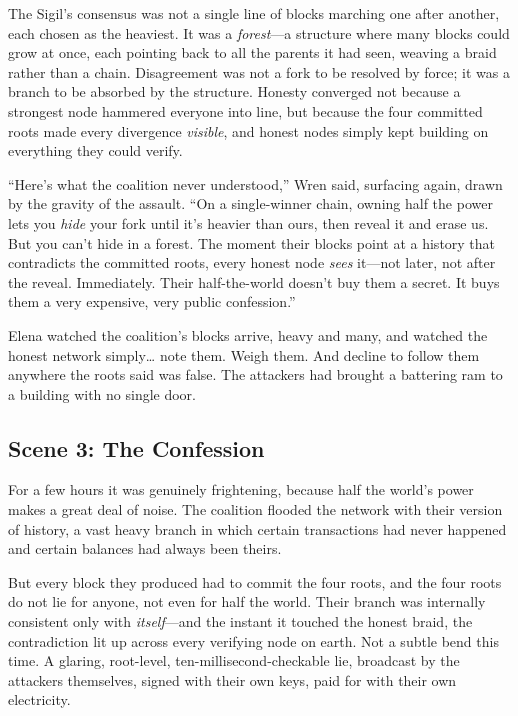 The Sigil's consensus was not a single line of blocks marching one after another,
each chosen as the heaviest. It was a \emph{forest}---a structure where many blocks
could grow at once, each pointing back to all the parents it had seen, weaving a
braid rather than a chain. Disagreement was not a fork to be resolved by force; it
was a branch to be absorbed by the structure. Honesty converged not because a
strongest node hammered everyone into line, but because the four committed roots
made every divergence \emph{visible}, and honest nodes simply kept building on
everything they could verify.

``Here's what the coalition never understood,'' Wren said, surfacing again, drawn by
the gravity of the assault. ``On a single-winner chain, owning half the power lets
you \emph{hide} your fork until it's heavier than ours, then reveal it and erase
us. But you can't hide in a forest. The moment their blocks point at a history that
contradicts the committed roots, every honest node \emph{sees} it---not later, not
after the reveal. Immediately. Their half-the-world doesn't buy them a secret. It
buys them a very expensive, very public confession.''

Elena watched the coalition's blocks arrive, heavy and many, and watched the honest
network simply\ldots{} note them. Weigh them. And decline to follow them anywhere
the roots said was false. The attackers had brought a battering ram to a building
with no single door.

\hypertarget{scene-3-the-confession}{%
\subsection{Scene 3: The
Confession}\label{scene-3-the-confession}}

For a few hours it was genuinely frightening, because half the world's power makes
a great deal of noise. The coalition flooded the network with their version of
history, a vast heavy branch in which certain transactions had never happened and
certain balances had always been theirs.

But every block they produced had to commit the four roots, and the four roots do
not lie for anyone, not even for half the world. Their branch was internally
consistent only with \emph{itself}---and the instant it touched the honest braid,
the contradiction lit up across every verifying node on earth. Not a subtle bend
this time. A glaring, root-level, ten-millisecond-checkable lie, broadcast by the
attackers themselves, signed with their own keys, paid for with their own
electricity.

